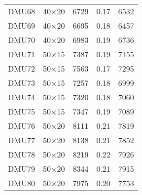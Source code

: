\begin{table}[H]
\begin{tabular}{@{}ccccc@{}}
DMU68 & 40$\times$20 & 6729 & 0.17 & 6532\\ 
DMU69 & 40$\times$20 & 6695 & 0.18 & 6457\\ 
DMU70 & 40$\times$20 & 6983 & 0.19 & 6736\\ 
DMU71 & 50$\times$15 & 7387 & 0.19 & 7155\\ 
DMU72 & 50$\times$15 & 7563 & 0.17 & 7295\\ 
DMU73 & 50$\times$15 & 7257 & 0.18 & 6999\\ 
DMU74 & 50$\times$15 & 7320 & 0.18 & 7060\\ 
DMU75 & 50$\times$15 & 7347 & 0.19 & 7089\\ 
DMU76 & 50$\times$20 & 8111 & 0.21 & 7819\\ 
DMU77 & 50$\times$20 & 8138 & 0.21 & 7852\\ 
DMU78 & 50$\times$20 & 8219 & 0.22 & 7926\\ 
DMU79 & 50$\times$20 & 8344 & 0.21 & 7915\\ 
DMU80 & 50$\times$20 & 7975 & 0.20 & 7753\\ \bottomrule
\end{tabular}
\end{table}
